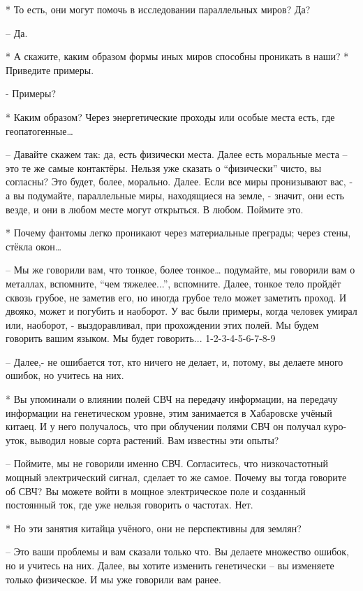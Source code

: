  * То есть, они могут помочь в исследовании параллельных миров? Да?

 – Да.

 * А скажите, каким образом формы иных миров способны проникать в наши?
 * Приведите примеры.

 - Примеры?

 * Каким образом? Через энергетические проходы или особые места есть, где геопатогенные…

 – Давайте скажем так: да, есть физически места. Далее есть моральные места – это те же самые контактёры. Нельзя уже сказать о “физически” чисто, вы согласны? Это будет, более, морально. Далее. Если все миры пронизывают вас, - а вы подумайте, параллельные миры, находящиеся на земле, - значит, они есть везде, и они в любом месте могут открыться. В  любом. Поймите это.

 * Почему фантомы легко проникают через материальные преграды; через стены, стёкла окон…

 – Мы же говорили вам, что тонкое, более тонкое… подумайте, мы говорили вам о металлах, вспомните, “чем тяжелее...”, вспомните. Далее, тонкое тело пройдёт сквозь грубое, не заметив его, но иногда грубое тело может заметить проход. И двояко, может и погубить и наоборот. У вас были примеры, когда человек умирал или, наоборот, - выздоравливал, при прохождении этих полей. Мы будем говорить вашим языком. Мы будет говорить...
 1-2-3-4-5-6-7-8-9

 – Далее,- не ошибается тот, кто ничего не делает, и, потому, вы делаете много ошибок, но учитесь на них.

 * Вы упоминали о влиянии полей СВЧ на передачу информации, на передачу информации на генетическом уровне, этим занимается в Хабаровске учёный  китаец. И у него получалось, что при облучении полями СВЧ он получал куро-уток, выводил новые сорта растений. Вам известны эти опыты?

 – Поймите, мы не говорили именно СВЧ. Согласитесь, что низкочастотный мощный электрический сигнал, сделает то же самое. Почему вы тогда говорите об СВЧ? Вы можете войти в мощное электрическое поле и созданный постоянный ток, где уже нельзя говорить о частотах. Нет.

 * Но эти занятия китайца учёного, они не перспективны для землян?

 – Это ваши проблемы и вам сказали только что. Вы делаете множество ошибок, но и учитесь на них. Далее, вы хотите изменить генетически – вы изменяете только физическое. И мы уже говорили вам ранее.

